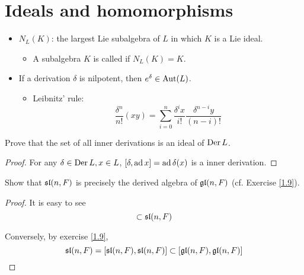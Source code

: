 \section{Ideals and homomorphisms }
  \begin{itemize}
    \item {} $N_L(K)$: the largest Lie subalgebra of $L$ in which $K$ is a Lie ideal.
    \begin{itemize}
      \item A subalgebra $K$ is called  if $N_L(K)=K$.
    \end{itemize}
    \item If a derivation $\delta$ is nilpotent, then $e^{\delta}\in \Aut(L)$.
    \begin{itemize}
      \item Leibnitz' rule:
      \begin{equation*}
        \frac{\delta^n}{n!}(xy)=\sum_{i=0}^{n}\frac{\delta^ix}{i!}\frac{\delta^{n-i}y}{(n-i)!}
      \end{equation*}
    \end{itemize}
  \end{itemize}

\begin{ex}
  Prove that the set of all inner derivations is an ideal of $\Der L$.
\end{ex}
\begin{proof}
  For any $\delta\in\Der L,x\in L$, $[\delta,\ad x]=\ad \delta(x)$ is a inner derivation.
\end{proof}

\begin{ex}
  Show that $\sl(n,F)$ is precisely the derived algebra of $\gl(n,F)$ (cf. Exercise \ref{1.9}).
\end{ex}
\begin{proof}
  It is easy to see
  \begin{equation*}
    [\gl(n, F), \gl(n, F)] \subset \sl(n, F)
  \end{equation*}

  Conversely, by exercise \ref{1.9},
  \begin{equation*}
    \sl(n, F) = [\sl(n, F), \sl(n, F)] \subset [\gl(n, F), \gl(n, F)]
  \end{equation*}
\end{proof}

